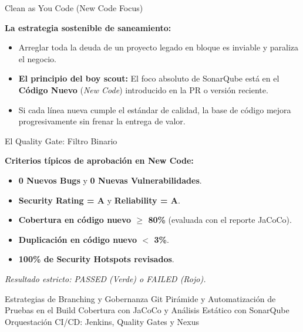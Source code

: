 \documentclass[aspectratio=169]{beamer}
\begin{document}
  {Clean as You Code (New Code Focus)}
  {
    {\small
    \textbf{La estrategia sostenible de saneamiento:}
    \begin{itemize}
      \setlength{\itemsep}{2pt}
      \item Arreglar toda la deuda de un proyecto legado en bloque es inviable y paraliza el negocio.
      \item \textbf{El principio del boy scout:} El foco absoluto de SonarQube está en el \textbf{Código Nuevo} (\textit{New Code}) introducido en la PR o versión reciente.
      \item Si cada línea nueva cumple el estándar de calidad, la base de código mejora progresivamente sin frenar la entrega de valor.
    \end{itemize}
    }
  }
  {El Quality Gate: Filtro Binario}
  {
    {\small
    \textbf{Criterios típicos de aprobación en New Code:}
    \begin{itemize}
      \setlength{\itemsep}{2pt}
      \item \textbf{0 Nuevos Bugs} y \textbf{0 Nuevas Vulnerabilidades}.
      \item \textbf{Security Rating = A} y \textbf{Reliability = A}.
      \item \textbf{Cobertura en código nuevo $\ge$ 80\%} (evaluada con el reporte JaCoCo).
      \item \textbf{Duplicación en código nuevo $<$ 3\%}.
      \item \textbf{100\% de Security Hotspots revisados}.
    \end{itemize}
    \vspace{0.1cm}
    \textit{Resultado estricto: PASSED (Verde) o FAILED (Rojo).}
    }
  }

  {Estrategias de Branching y Gobernanza Git}
  {Pirámide y Automatización de Pruebas en el Build}
  {Cobertura con JaCoCo y Análisis Estático con SonarQube}
  {Orquestación CI/CD: Jenkins, Quality Gates y Nexus}

\end{document}
